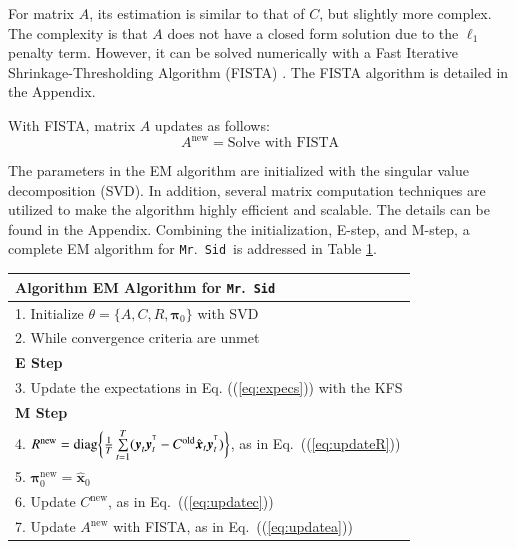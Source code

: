 \documentclass[times,twocolumn,final,authoryear]{elsarticle}
\newcommand{\mrsid}{{\sc \texttt{Mr}.~\texttt{Sid}}}
\providecommand{\mb}[1]{\boldsymbol{#1}}
\newcommand{\bx}{\mb{x}}
\newcommand{\by}{\mb{y}}
\newcommand{\T}{^{\ensuremath{\mathsf{T}}}}           %
\newcommand{\diag}{\operatornamewithlimits{diag}}
\let\oldref\ref
\renewcommand{\ref}[1]{(\oldref{#1})}
\begin{document}
For matrix $A$, its estimation is similar to that of $C$, but slightly more complex. The complexity is that $A$ does not have a closed form solution due to the $\ell_1$ penalty term. However, it can be solved numerically with a Fast Iterative Shrinkage-Thresholding Algorithm (FISTA) \citep{beck2009fast}. The FISTA algorithm is detailed in the Appendix.

With FISTA, matrix $A$ updates as follows:
\begin{equation}\label{eq:updatea}
A^{\text{new}} = \text{Solve with FISTA}
\end{equation}

The parameters in the EM algorithm are initialized with the singular value decomposition (SVD). In addition, several matrix computation techniques are utilized to make the algorithm highly efficient and scalable. The details can be found in the Appendix. Combining the initialization, E-step, and M-step, a complete EM algorithm for \mrsid~is addressed in Table \oldref{tab:em}.\\
\begin{table}
\label{tab:em}
\begin{tabular}{l}
\hline
\textbf{Algorithm } EM Algorithm for \mrsid\\
\hline
1. Initialize $\theta =\{A,C,R,\mathbf{\pi}_0\}$ with SVD\\

2. While convergence criteria are unmet \\

\textbf{E Step}\\
3. Update the expectations in Eq. \ref{eq:expecs} with the KFS\\

\textbf{M Step}\\

4. $R^{\text{new}}=\diag\biggl\{\frac{1}{T}\sum\limits_{t=1}^{T}(\by_t\by_t^{\T}-C^{\text{old}} \hat{\bx}_t\by_t^{\T})\biggr\}$, as in Eq.~\ref{eq:updateR}\\
5. $\mathbf{\pi}_0^{\text{new}}=\hat{\bx}_0$\\
6. Update $C^{\text{new}}$, as in Eq.~\ref{eq:updatec}\\
7. Update $A^{\text{new}}$ with FISTA, as in Eq.~\ref{eq:updatea}\\
\hline
\end{tabular}
\end{table}
\end{document}
